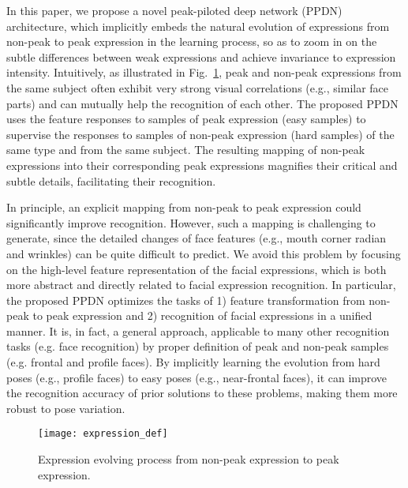 \documentclass[runningheads]{llncs}
\begin{document}
In this paper, we propose a novel peak-piloted deep network (PPDN) 
architecture, which  implicitly embeds the natural evolution of expressions
from non-peak to peak expression in the learning 
process, so as to zoom in on the subtle differences between weak expressions
and achieve invariance to expression intensity.  Intuitively, 
as illustrated in Fig.~\ref{fig:evolve}, peak and non-peak expressions from 
the same subject often exhibit very strong visual correlations (e.g., similar 
face parts) and can mutually help the recognition of each other. The 
proposed PPDN uses the feature responses to samples of peak expression 
(easy samples) to supervise the responses to samples of non-peak 
expression (hard samples) of the same type and from the same subject. 
The resulting mapping of non-peak expressions into their corresponding 
peak expressions magnifies their critical and subtle details, facilitating
their recognition.

In principle, an explicit mapping from non-peak to peak expression 
could significantly improve recognition. However, such a mapping is
challenging to generate, since the detailed changes of face features 
(e.g., mouth corner radian and wrinkles) can be quite difficult to predict. 
We avoid this problem by focusing on 
the high-level feature representation of the facial expressions, which
is both more abstract and directly related to facial expression recognition. 
In particular, the proposed PPDN optimizes the tasks of 1) feature 
transformation from non-peak to peak expression and 2) recognition of facial 
expressions in a unified manner. It is, in fact, a general approach,
applicable to many other recognition tasks (e.g. face recognition) by 
proper definition of peak and non-peak samples (e.g. frontal and 
profile faces). By implicitly learning the evolution from hard poses (e.g., profile faces) to  easy poses 
(e.g., near-frontal faces), it
can improve the recognition accuracy of prior solutions to these
problems, making them more robust to pose variation.



\begin{figure}[t]
\centering
\texttt{[image: expression\_def]}
\caption{Expression evolving process from non-peak expression to peak expression. }
\label{fig:evolve}
\end{figure}
\end{document}
